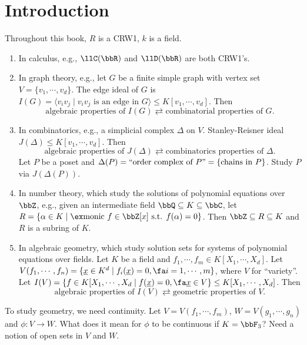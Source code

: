 \chapter{Introduction}

\begin{remark}
    Throughout this book, $R$ is a CRW1, $k$ is a field.
\end{remark}

\begin{remark}[Application]
    \begin{enumerate}[(1)]
        \item In calculus, e.g., $\llC(\bbR)$ and $\llD(\bbR)$ are both CRW1's.
        \item In graph theory, e.g., let $G$ be a finite simple graph with vertex set $V = \{v_1,\cdots,v_d\}$. The edge ideal of $G$ is $I(G) = \langle v_iv_j \mid v_iv_j \text{ is an edge in }G\rangle \leq K[v_1,\cdots,v_d]$. Then
            \[\text{algebraic properties of $I(G)$} \rightleftarrows \text{combinatorial properties of $G$}.\]
        \item In combinatorics, e.g., a simplicial complex $\Delta$ on $V$. Stanley-Reisner ideal $J(\Delta) \leq K[v_1,\cdots,v_d]$. Then
            \[\text{algebraic properties of $J(\Delta)$} \rightleftarrows \text{combinatorics properties of $\Delta$}.\]
            Let $P$ be a poset and $\Delta(P) = ``\text{order complex of $P$''} = \{\text{chains in $P$}\}$. Study $P$ via $J(\Delta(P))$.
        \item In number theory, which study the solutions of polynomial equations over $\bbZ$, e.g., given an intermediate field $\bbQ \subseteq K \subseteq \bbC$, let $R = \{\alpha \in K \mid \ex \text{monic }f \in \bbZ[x] \text{ s.t. } f(\alpha) = 0\}$. Then $\bbZ \subseteq R \subseteq K$ and $R$ is a subring of $K$.
        \item In algebraic geometry, which study solution sets for systems of polynomial equations over fields. Let $K$ be a field and $f_1,\cdots,f_m \in K[X_1,\cdots,X_d]$. Let $V(f_1,\cdots,f_n) = \{\underline x \in K^d \mid f_i(\underline x) = 0,\fa i = 1,\cdots,m\}$, where $V$ for ``variety''. Let $I(V) = \{f \in K[X_1,\cdots,X_d \mid f(\underline x) = 0,\fa \underline x \in V\} \leq K[X_1,\cdots,X_d]$. Then
            \[\text{algebraic properties of $I(V)$} \rightleftarrows \text{geometric properties of $V$}.\]
    \end{enumerate}
\end{remark}

\begin{remark}
    To study geometry, we need continuity. Let $V = V(f_1,\cdots,f_m)$, $W = V(g_1,\cdots,g_n)$ and $\phi: V \to W$. What does it mean for $\phi$ to be continuous if $K = \bbF_3$? Need a notion of open sets in $V$ and $W$.
\end{remark}

